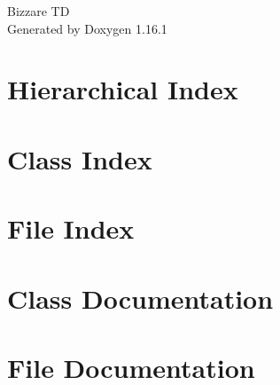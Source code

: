 \documentclass[twoside]{book}
\newcommand{\+}{\discretionary{\mbox{\scriptsize$\hookleftarrow$}}{}{}}
\newcommand{\clearemptydoublepage}{%
    \newpage{\pagestyle{empty}\cleardoublepage}%
  }
\begin{document}
  \raggedbottom
    \hypersetup{pageanchor=false,
                bookmarksnumbered=true,
                pdfencoding=unicode
               }
  \begin{titlepage}
  \vspace*{7cm}
  \begin{center}%
  {\Large Bizzare TD}\\
  \vspace*{1cm}
  {\large Generated by Doxygen 1.16.1}\\
  \end{center}
  \end{titlepage}
  \clearemptydoublepage
  \tableofcontents
  \clearemptydoublepage
  \hypersetup{pageanchor=true}
\chapter{Hierarchical Index}

\chapter{Class Index}

\chapter{File Index}

\chapter{Class Documentation}









\chapter{File Documentation}






  \backmatter
  \newpage
  \clearemptydoublepage
  \printindex
\end{document}
